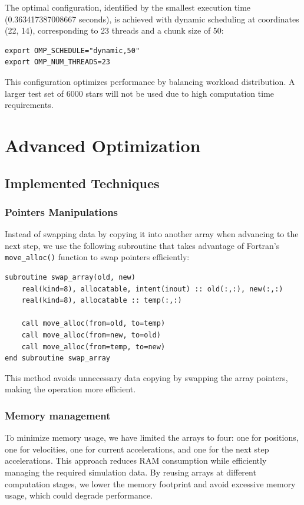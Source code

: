 \documentclass[english,11pt]{article}
\begin{document}
The optimal configuration, identified by the smallest execution time (0.363417387008667 seconds), is achieved with dynamic scheduling at coordinates (22, 14), corresponding to 23 threads and a chunk size of 50:

\begin{verbatim}
export OMP_SCHEDULE="dynamic,50"
export OMP_NUM_THREADS=23
\end{verbatim}

This configuration optimizes performance by balancing workload distribution. A larger test set of 6000 stars will not be used due to high computation time requirements.


\section{Advanced Optimization}
\subsection{Implemented Techniques}
\subsubsection{Pointers Manipulations}
Instead of swapping data by copying it into another array when advancing to the next step, we use the following subroutine that takes advantage of Fortran's \texttt{move\_alloc()} function to swap pointers efficiently:

\begin{verbatim}
subroutine swap_array(old, new)
    real(kind=8), allocatable, intent(inout) :: old(:,:), new(:,:)
    real(kind=8), allocatable :: temp(:,:)

    call move_alloc(from=old, to=temp)
    call move_alloc(from=new, to=old)
    call move_alloc(from=temp, to=new)
end subroutine swap_array
\end{verbatim}

This method avoids unnecessary data copying by swapping the array pointers, making the operation more efficient.

\subsubsection{Memory management}
To minimize memory usage, we have limited the arrays to four: one for positions, one for velocities, one for current accelerations, and one for the next step accelerations. This approach reduces RAM consumption while efficiently managing the required simulation data. By reusing arrays at different computation stages, we lower the memory footprint and avoid excessive memory usage, which could degrade performance.
\end{document}
